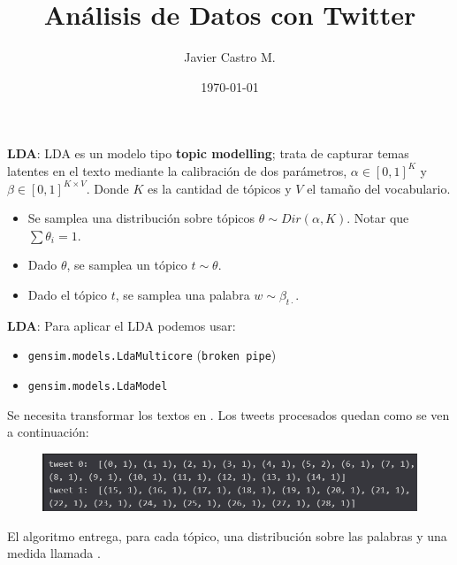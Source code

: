 \documentclass{beamer}
\title[Análisis de Datos con Twitter]{Análisis de Datos con Twitter}
\author{Javier Castro M.}
\institute{Universidad De Chile}
\date{\today}
\begin{document}
	\maketitle
	
	\begin{frame}{\textbf{LDA}: }
		LDA es un modelo tipo \textbf{topic modelling}; trata de capturar temas latentes en el texto mediante la calibración de dos parámetros, $\alpha\in [0,1]^{K}$ y $\beta \in [0,1]^{K\times V}$. Donde $K$ es la cantidad de tópicos y $V$ el tamaño del vocabulario. 
		
		\begin{itemize}
			\item Se samplea una distribución sobre tópicos $\theta\sim Dir(\alpha, K)$. Notar que $\sum \theta_i = 1$.
			\item Dado $\theta$, se samplea un tópico $t\sim\theta$.
			\item Dado el tópico $t$, se samplea una palabra $w\sim\beta_{t\cdot}$.
		\end{itemize}
		
		
	\end{frame}

	\begin{frame}{\textbf{LDA}: }
		Para aplicar el LDA podemos usar:
		\begin{itemize}
			\item \texttt{gensim.models.LdaMulticore} (\texttt{broken pipe})
			\item \texttt{gensim.models.LdaModel} 
		\end{itemize}
		Se necesita transformar los textos en . Los tweets procesados quedan como se ven a continuación:
		
		\begin{figure}[h]
			\centering
			\includegraphics[scale=.5]{../imgs/segunda_avance/bow_tweets_ex.png}
		\end{figure} 
	
		El algoritmo entrega, para cada tópico, una distribución sobre las palabras y una medida llamada . 
		
	\end{frame}
\end{document}
